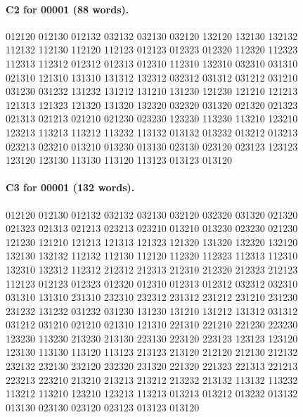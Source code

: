 \documentclass[11pt]{article}
\theoremstyle{remark}
\numberwithin{equation}{section}
\begin{document}
\paragraph{C2 for 00001 (88 words).}
\begingroup\small\ttfamily\begin{flushleft}
012120 012130 012132 032132 032130 032120 132120 132130 132132\\
112132 112130 112120 112123 012123 012323 012320 112320 112323\\
112313 112312 012312 012313 012310 112310 132310 032310 031310\\
021310 121310 131310 131312 132312 032312 031312 031212 031210\\
031230 031232 131232 131212 131210 131230 121230 121210 121213\\
121313 121323 121320 131320 132320 032320 031320 021320 021323\\
021313 021213 021210 021230 023230 123230 113230 113210 123210\\
123213 113213 113212 113232 113132 013132 013232 013212 013213\\
023213 023210 013210 013230 013130 023130 023120 023123 123123\\
123120 123130 113130 113120 113123 013123 013120\\
\end{flushleft}\endgroup
\paragraph{C3 for 00001 (132 words).}
\begingroup\small\ttfamily\begin{flushleft}
012120 012130 012132 032132 032130 032120 032320 031320 021320\\
021323 021313 021213 023213 023210 013210 013230 023230 021230\\
121230 121210 121213 121313 121323 121320 131320 132320 132120\\
132130 132132 112132 112130 112120 112320 112323 112313 112310\\
132310 132312 112312 212312 212313 212310 212320 212323 212123\\
112123 012123 012323 012320 012310 012313 012312 032312 032310\\
031310 131310 231310 232310 232312 231312 231212 231210 231230\\
231232 131232 031232 031230 131230 131210 131212 131312 031312\\
031212 031210 021210 021310 121310 221310 221210 221230 223230\\
123230 113230 213230 213130 223130 223120 223123 123123 123120\\
123130 113130 113120 113123 213123 213120 212120 212130 212132\\
232132 232130 232120 232320 231320 221320 221323 221313 221213\\
223213 223210 213210 213213 213212 213232 213132 113132 113232\\
113212 113210 123210 123213 113213 013213 013212 013232 013132\\
013130 023130 023120 023123 013123 013120\\
\end{flushleft}\endgroup
\end{document}
